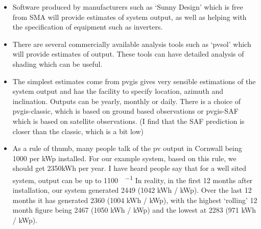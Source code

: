 \documentclass{article}
\begin{document}
\begin{itemize}
\item	Software produced by manufacturers such as ‘Sunny Design’ which is free from SMA will provide estimates of system output, as well as helping with the specification of equipment such as inverters.
\item	There are several commercially available analysis tools such as ‘pvsol’ which will provide estimates of output. These tools can have detailed analysis of shading which can be useful.
\item	The simplest estimates come from pvgis \cite{PVGIS} gives very sensible estimations of the system output and has the facility to specify location, azimuth  and inclination. Outputs can be yearly, monthly or daily. There is a choice of pvgis-classic, which is based on ground based observations or pvgis-SAF which is based on satellite observations. (I find that the SAF prediction is closer than the classic, which is a bit low)
\item	As a rule of thumb, many people talk of the pv output in Cornwall being \SI{1000}{\kilowatthour} per kWp installed. For our example system, based on this rule, we should get 2350kWh per year. I have heard people say that for a well sited system, output can be up to \SI{1100}{\kilowatthour\per\kilowattpeak}
In reality, in the first 12 months after installation, our system generated \SI{2449}{\kilowatthour} (1042 kWh / kWp). Over the last 12 months it has generated \SI{2360}{\kilowatthour} (1004 kWh / kWp), with the highest ‘rolling’ 12 month figure being \SI{2467}{\kilowatthour} (1050 kWh / kWp) and the lowest at \SI{2283}{\kilowatthour} (971 kWh / kWp). 

\end{itemize}


\printbibliography
\end{document}
